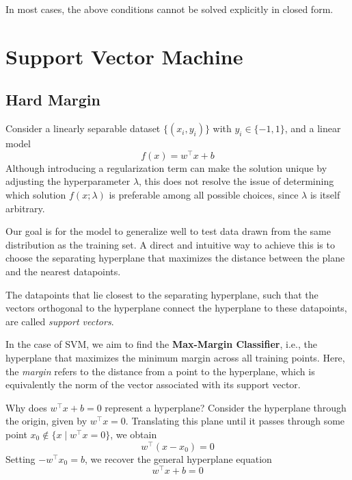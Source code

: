 \documentclass[../main]{subfiles}
\begin{document}
In most cases, the above conditions cannot be solved explicitly in closed form.  

\section{Support Vector Machine}
\subsection{Hard Margin}
Consider a linearly separable dataset $\{(x_i, y_i)\}$ with $y_i \in \{-1,1\}$, and a linear model
\begin{equation}
    f(x) = w^\top x + b
\end{equation}
Although introducing a regularization term can make the solution unique by adjusting the hyperparameter $\lambda$, this does not resolve the issue of determining which solution $f(x;\lambda)$ is preferable among all possible choices, since $\lambda$ is itself arbitrary.

Our goal is for the model to generalize well to test data drawn from the same distribution as the training set.  
A direct and intuitive way to achieve this is to choose the separating hyperplane that maximizes the distance between the plane and the nearest datapoints.

\begin{definition}
    The datapoints that lie closest to the separating hyperplane, such that the vectors orthogonal to the hyperplane connect the hyperplane to these datapoints, are called \emph{support vectors}.
\end{definition}
In the case of SVM, we aim to find the \textbf{Max-Margin Classifier}, i.e., the hyperplane that maximizes the minimum margin across all training points.  
Here, the \emph{margin} refers to the distance from a point to the hyperplane, which is equivalently the norm of the vector associated with its support vector.

\begin{remark}
    Why does $w^\top x + b = 0$ represent a hyperplane?  
    Consider the hyperplane through the origin, given by $w^\top x = 0$.  
    Translating this plane until it passes through some point $x_0 \notin \{x \mid w^\top x = 0\}$, we obtain
    \[
        w^\top (x - x_0) = 0
    \]
    Setting $-w^\top x_0 = b$, we recover the general hyperplane equation
    \[
        w^\top x + b = 0
    \]
\end{remark}
\end{document}
